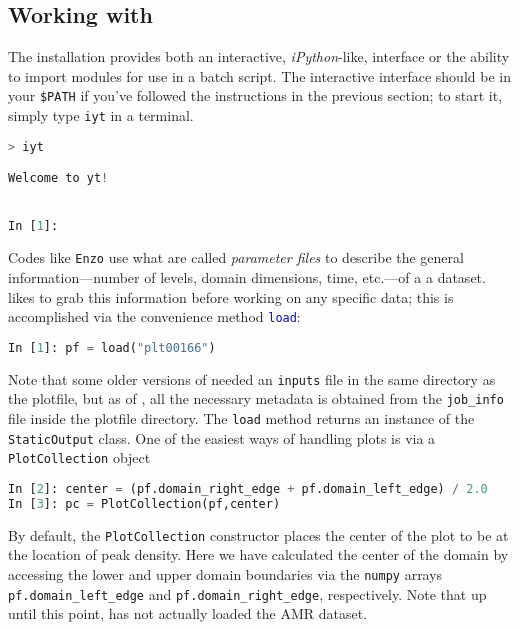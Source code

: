 
\subsection{Working with \yt}
The \yt installation provides both an interactive, {\it iPython}-like,
interface or the ability to import \yt modules for use in a batch
script.  The interactive interface should be in your {\tt \$PATH} if
you've followed the instructions in the previous section; to start it,
simply type {\tt iyt} in a terminal.
\begin{lstlisting}[language=Python]
> iyt

Welcome to yt!


In [1]: 
\end{lstlisting}
Codes like {\tt Enzo} use what are called {\it parameter files} to
describe the general information---number of levels, domain
dimensions, time, etc.---of a a dataset.  \yt likes to grab this
information before working on any specific data; this is accomplished
via the convenience method \textcolor{blue}{\tt load}:
\begin{lstlisting}[language=Python]
In [1]: pf = load("plt00166")
\end{lstlisting}
Note that some older versions of \yt needed an {\tt inputs} file 
in the same directory as the plotfile, but as of , all the
necessary metadata is obtained from the {\tt job\_info} file inside
the plotfile directory.
The {\tt load} method returns an instance of the {\tt StaticOutput} class.  One
of the easiest ways of handling plots is via a {\tt PlotCollection}
object
\begin{lstlisting}[language=Python]
In [2]: center = (pf.domain_right_edge + pf.domain_left_edge) / 2.0
In [3]: pc = PlotCollection(pf,center)
\end{lstlisting}
By default, the {\tt PlotCollection} constructor places the center of
the plot to be at the location of peak density.  Here we have
calculated the center of the domain by accessing the lower and upper
domain boundaries via the {\tt numpy} arrays {\tt
  pf.domain\_left\_edge} and {\tt pf.domain\_right\_edge},
respectively.  Note that up until this point, \yt has not actually
loaded the AMR dataset.

